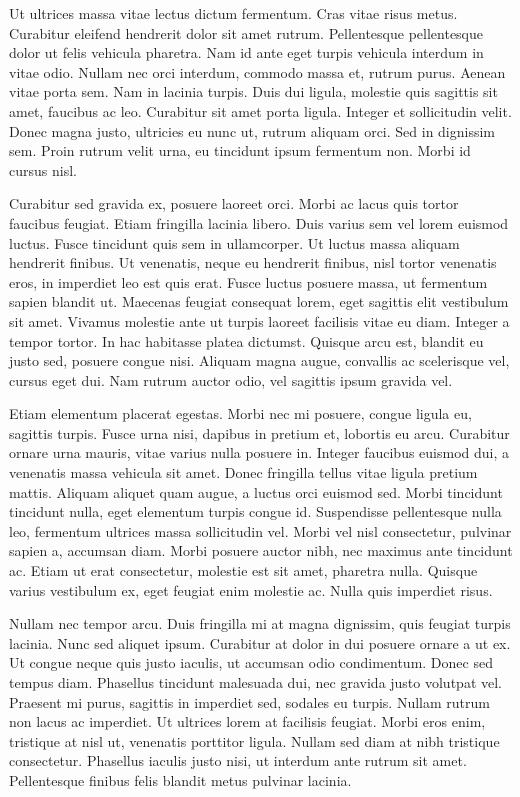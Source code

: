 Ut ultrices massa vitae lectus dictum fermentum. Cras vitae risus metus. Curabitur eleifend hendrerit dolor sit amet rutrum. Pellentesque pellentesque dolor ut felis vehicula pharetra. Nam id ante eget turpis vehicula interdum in vitae odio. Nullam nec orci interdum, commodo massa et, rutrum purus. Aenean vitae porta sem. Nam in lacinia turpis. Duis dui ligula, molestie quis sagittis sit amet, faucibus ac leo. Curabitur sit amet porta ligula. Integer et sollicitudin velit. Donec magna justo, ultricies eu nunc ut, rutrum aliquam orci. Sed in dignissim sem. Proin rutrum velit urna, eu tincidunt ipsum fermentum non. Morbi id cursus nisl.

Curabitur sed gravida ex, posuere laoreet orci. Morbi ac lacus quis tortor faucibus feugiat. Etiam fringilla lacinia libero. Duis varius sem vel lorem euismod luctus. Fusce tincidunt quis sem in ullamcorper. Ut luctus massa aliquam hendrerit finibus. Ut venenatis, neque eu hendrerit finibus, nisl tortor venenatis eros, in imperdiet leo est quis erat. Fusce luctus posuere massa, ut fermentum sapien blandit ut. Maecenas feugiat consequat lorem, eget sagittis elit vestibulum sit amet. Vivamus molestie ante ut turpis laoreet facilisis vitae eu diam. Integer a tempor tortor. In hac habitasse platea dictumst. Quisque arcu est, blandit eu justo sed, posuere congue nisi. Aliquam magna augue, convallis ac scelerisque vel, cursus eget dui. Nam rutrum auctor odio, vel sagittis ipsum gravida vel.

Etiam elementum placerat egestas. Morbi nec mi posuere, congue ligula eu, sagittis turpis. Fusce urna nisi, dapibus in pretium et, lobortis eu arcu. Curabitur ornare urna mauris, vitae varius nulla posuere in. Integer faucibus euismod dui, a venenatis massa vehicula sit amet. Donec fringilla tellus vitae ligula pretium mattis. Aliquam aliquet quam augue, a luctus orci euismod sed. Morbi tincidunt tincidunt nulla, eget elementum turpis congue id. Suspendisse pellentesque nulla leo, fermentum ultrices massa sollicitudin vel. Morbi vel nisl consectetur, pulvinar sapien a, accumsan diam. Morbi posuere auctor nibh, nec maximus ante tincidunt ac. Etiam ut erat consectetur, molestie est sit amet, pharetra nulla. Quisque varius vestibulum ex, eget feugiat enim molestie ac. Nulla quis imperdiet risus.

Nullam nec tempor arcu. Duis fringilla mi at magna dignissim, quis feugiat turpis lacinia. Nunc sed aliquet ipsum. Curabitur at dolor in dui posuere ornare a ut ex. Ut congue neque quis justo iaculis, ut accumsan odio condimentum. Donec sed tempus diam. Phasellus tincidunt malesuada dui, nec gravida justo volutpat vel. Praesent mi purus, sagittis in imperdiet sed, sodales eu turpis. Nullam rutrum non lacus ac imperdiet. Ut ultrices lorem at facilisis feugiat. Morbi eros enim, tristique at nisl ut, venenatis porttitor ligula. Nullam sed diam at nibh tristique consectetur. Phasellus iaculis justo nisi, ut interdum ante rutrum sit amet. Pellentesque finibus felis blandit metus pulvinar lacinia.


